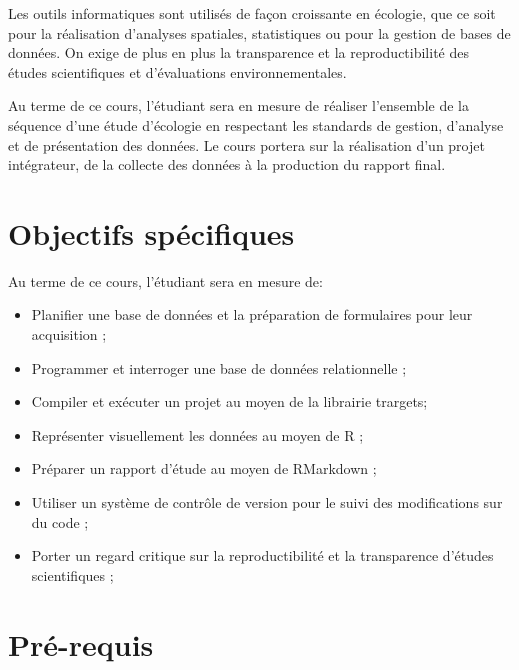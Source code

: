 \documentclass[12]{article}
\begin{document}
	Les outils informatiques sont utilisés de façon croissante en écologie,
	que ce soit pour la réalisation d'analyses spatiales, statistiques ou pour
	la gestion de bases de données. On exige de plus en plus la transparence et
	la reproductibilité des études scientifiques et d'évaluations environnementales. 

	Au terme de ce cours, l'étudiant sera en mesure de réaliser l'ensemble de la 
	séquence d'une étude d'écologie en respectant les standards de gestion,  d'analyse et de présentation des données. Le cours portera sur la réalisation d'un projet intégrateur, de la collecte des données à la production du rapport final. 

	\newpage
	
	\section*{Objectifs spécifiques}

	Au terme de ce cours, l'étudiant sera en mesure de: 

	\begin{itemize}
	\renewcommand{\labelitemi}{$\bullet$}

	\item Planifier une base de données et la préparation de formulaires pour leur acquisition ; 

	\item Programmer et interroger une base de données relationnelle ;

	\item Compiler et exécuter un projet au moyen de la librairie trargets;

	\item Représenter visuellement les données au moyen de R ;

	\item Préparer un rapport d'étude au moyen de RMarkdown ;

	\item Utiliser un système de contrôle de version pour le suivi des modifications sur du code ;

	\item Porter un regard critique sur la reproductibilité et la transparence d'études scientifiques ;

	\end{itemize}

	\section*{Pré-requis}
\end{document}
